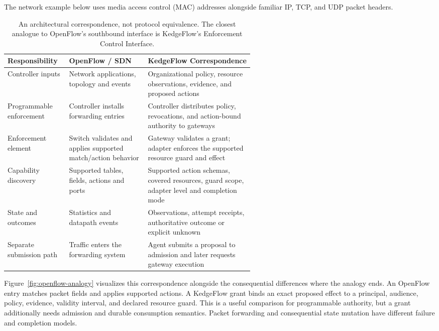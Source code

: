 The network example below uses media access control (MAC) addresses alongside familiar IP, TCP, and UDP packet headers.

\begin{table}[!ht]
\centering
\small
\begin{tabularx}{\linewidth}{L{0.25\linewidth}L{0.32\linewidth}X}
\toprule
\textbf{Responsibility} & \textbf{OpenFlow / SDN} & \textbf{KedgeFlow Correspondence}\\
\midrule
Controller inputs & Network applications, topology and events & Organizational policy, resource observations, evidence, and proposed actions\\
Programmable enforcement & Controller installs forwarding entries & Controller distributes policy, revocations, and action-bound authority to gateways\\
Enforcement element & Switch validates and applies supported match/action behavior & Gateway validates a grant; adapter enforces the supported resource guard and effect\\
Capability discovery & Supported tables, fields, actions and ports & Supported action schemas, covered resources, guard scope, adapter level and completion mode\\
State and outcomes & Statistics and datapath events & Observations, attempt receipts, authoritative outcome or explicit unknown\\
Separate submission path & Traffic enters the forwarding system & Agent submits a proposal to admission and later requests gateway execution\\
\bottomrule
\end{tabularx}
\caption{An architectural correspondence, not protocol equivalence. The closest analogue to OpenFlow's southbound interface is KedgeFlow's Enforcement Control Interface.}
\label{tab:openflow-correspondence}
\end{table}

Figure~\ref{fig:openflow-analogy} visualizes this correspondence alongside the consequential differences where the analogy ends. An OpenFlow entry matches packet fields and applies supported actions. A KedgeFlow grant binds an exact proposed effect to a principal, audience, policy, evidence, validity interval, and declared resource guard. This is a useful comparison for programmable authority, but a grant additionally needs admission and durable consumption semantics. Packet forwarding and consequential state mutation have different failure and completion models.

